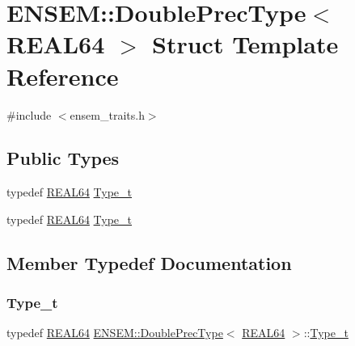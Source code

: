 \hypertarget{structENSEM_1_1DoublePrecType_3_01REAL64_01_4}{}\section{E\+N\+S\+EM\+:\+:Double\+Prec\+Type$<$ R\+E\+A\+L64 $>$ Struct Template Reference}
\label{structENSEM_1_1DoublePrecType_3_01REAL64_01_4}


{\ttfamily \#include $<$ensem\+\_\+traits.\+h$>$}

\subsection*{Public Types}
\begin{DoxyCompactItemize}
\item 
typedef \mbox{\hyperlink{namespaceENSEM_a85b215b9f1f43715aebee01718e25082}{R\+E\+A\+L64}} \mbox{\hyperlink{structENSEM_1_1DoublePrecType_3_01REAL64_01_4_aa802de703a59b214ae8bb817ec704252}{Type\+\_\+t}}
\item 
typedef \mbox{\hyperlink{namespaceENSEM_a85b215b9f1f43715aebee01718e25082}{R\+E\+A\+L64}} \mbox{\hyperlink{structENSEM_1_1DoublePrecType_3_01REAL64_01_4_aa802de703a59b214ae8bb817ec704252}{Type\+\_\+t}}
\end{DoxyCompactItemize}


\subsection{Member Typedef Documentation}
\mbox{\label{structENSEM_1_1DoublePrecType_3_01REAL64_01_4_aa802de703a59b214ae8bb817ec704252}} 
\subsubsection{\texorpdfstring{Type\_t}{Type\_t}\hspace{0.1cm}{\footnotesize\ttfamily [1/2]}}
{\footnotesize\ttfamily typedef \mbox{\hyperlink{namespaceENSEM_a85b215b9f1f43715aebee01718e25082}{R\+E\+A\+L64}} \mbox{\hyperlink{structENSEM_1_1DoublePrecType}{E\+N\+S\+E\+M\+::\+Double\+Prec\+Type}}$<$ \mbox{\hyperlink{namespaceENSEM_a85b215b9f1f43715aebee01718e25082}{R\+E\+A\+L64}} $>$\+::\mbox{\hyperlink{structENSEM_1_1DoublePrecType_3_01REAL64_01_4_aa802de703a59b214ae8bb817ec704252}{Type\+\_\+t}}}

